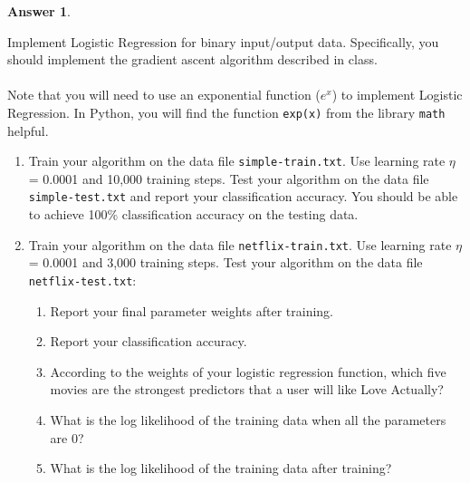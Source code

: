 \documentclass[12pt]{article}
\renewcommand{\(}{\left(}
\renewcommand{\)}{\right)}
\theoremstyle{definition}
\newtheorem*{answer}{Answer}
\begin{document}
\begin{enumerate}
{{    \begin{shaded}
    \begin{answer}
    
    \end{answer}
    \end{shaded}
    
    \newpage
    
    \item Implement Logistic Regression for binary input/output data. Specifically, you should implement the gradient ascent algorithm described in class.\\ \\
    Note that you will need to use an exponential function ($e^x$) to implement Logistic Regression. In Python, you will find the function \texttt{exp(x)} from the library \texttt{math} helpful.
    
    \begin{enumerate}
        \item Train your algorithm on the data file \texttt{simple-train.txt}. Use learning rate $\eta$ = 0.0001 and 10,000 training steps. Test your algorithm on the data file \texttt{simple-test.txt} and report your classification accuracy. You should be able to achieve 100\% classification accuracy on the testing data.
        \item Train your algorithm on the data file \texttt{netflix-train.txt}. Use learning rate $\eta$ = 0.0001 and 3,000 training steps. Test your algorithm on the data file \texttt{netflix-test.txt}:
        \begin{enumerate}
            \item Report your final parameter weights after training.
            \item Report your classification accuracy.
            \item According to the weights of your logistic regression function, which five movies are the strongest predictors that a user will like Love Actually?
            \item What is the log likelihood of the training data when all the parameters are 0?
            \item What is the log likelihood of the training data after training?
        \end{enumerate}
        

\end{enumerate}}}
\end{enumerate}
\end{document}
